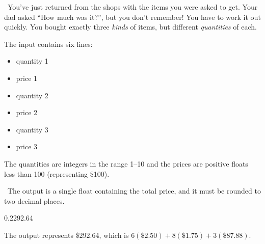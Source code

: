 
\Question\ You've just returned from the shops with the items you were asked to get. Your
dad asked ``How much was it?'', but you don't remember! You have to work it out quickly.
You bought exactly three \emph{kinds} of items, but different \emph{quantities} of each.

\Input The input contains six lines:
\begin{itemize}
  \item quantity 1
  \item price 1
  \item quantity 2
  \item price 2
  \item quantity 3
  \item price 3
\end{itemize}
The quantities are integers in the range 1--10 and the prices are positive floats less
than 100 (representing \$100).

\Output\ The output is a single float containing the total price, and it must be rounded
to two decimal places.

\Sample

       {0.2}{292.64}

\Explanation The output represents \$292.64, which is $6(\$2.50) + 8(\$1.75) + 3(\$87.88)$.

